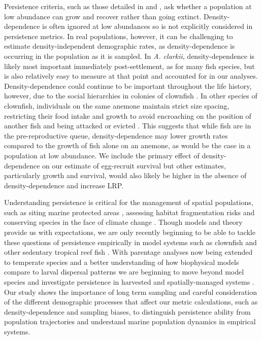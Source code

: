 \documentclass[12pt, oneside]{article}   	%
\begin{document}
Persistence criteria, such as those detailed in \cite{hastings_persistence_2006} and \cite{burgess2014beyond}, ask whether a population at low abundance can grow and recover rather than going extinct. Density-dependence is often ignored at low abundances \citep{botsford2019population} so is not explicitly considered in persistence metrics. In real populations, however, it can be challenging to estimate density-independent demographic rates, as density-dependence is occurring in the population as it is sampled. In \textit{A. clarkii}, density-dependence is likely most important immediately post-settlement, as for many fish species, but is also relatively easy to measure at that point and accounted for in our analyses. Density-dependence could continue to be important throughout the life history, however, due to the social hierarchies in colonies of clownfish \citep[e.g.][]{buston2011determinants}. In other species of clownfish, individuals on the same anemone maintain strict size spacing, restricting their food intake and growth to avoid encroaching on the position of another fish and being attacked or evicted \citep[seen in \textit{A. percula},][]{buston2003forcible, buston2003social}. This suggests that while fish are in the pre-reproductive queue, density-dependence may lower growth rates compared to the growth of fish alone on an anemone, as would be the case in a population at low abundance. We include the primary effect of density-dependence on our estimate of egg-recruit survival but other estimates, particularly growth and survival, would also likely be higher in the absence of density-dependence and increase LRP.

Understanding persistence is critical for the management of spatial populations, such as siting marine protected areas \citep[e.g.,][]{kaplan_model-based_2009}, assessing habitat fragmentation risks \citep[e.g.,][]{smith2002population, fahrig2001much} and conserving species in the face of climate change \citep[e.g.,][]{coleman2017anticipating, fuller2015persistence}. Though models and theory provide us with expectations, we are only recently beginning to be able to tackle these questions of persistence empirically in model systems such as clownfish and other sedentary tropical reef fish \citep[e.g.,][]{salles_coral_2015, johnson2018integrating}. With parentage analyses now being extended to temperate species \citep[e.g.,][]{baetscher2019dispersal} and a better understanding of how biophysical models compare to larval dispersal patterns \citep{bode2019validation} we are beginning to move beyond model species and investigate persistence in harvested and spatially-managed systems \citep[e.g.,][]{garavelli2018population}. Our study shows the importance of long term sampling and careful consideration of the different demographic processes that affect our metric calculations, such as density-dependence and sampling biases, to distinguish persistence ability from population trajectories and understand marine population dynamics in empirical systems.
\end{document}
